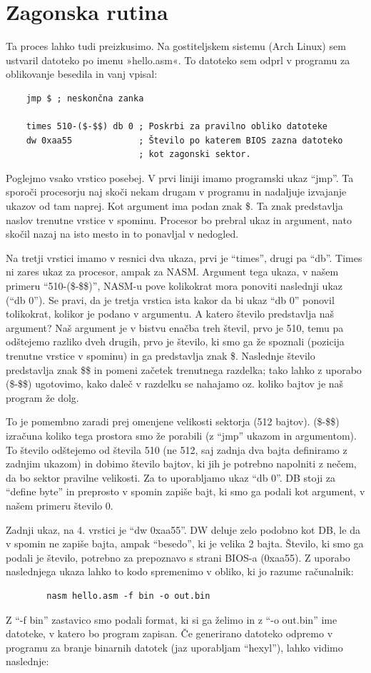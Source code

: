 \documentclass{report}
\begin{document}
\section{Zagonska rutina}
Ta proces lahko tudi preizkusimo. Na gostiteljskem sistemu (Arch Linux) sem ustvaril datoteko po imenu »hello.asm«. To datoteko sem odprl v programu za oblikovanje besedila in vanj vpisal:
\begin{verbatim}
    jmp $ ; neskončna zanka

    times 510-($-$$) db 0 ; Poskrbi za pravilno obliko datoteke
    dw 0xaa55             ; Število po katerem BIOS zazna datoteko
                          ; kot zagonski sektor.
\end{verbatim}

Poglejmo vsako vrstico posebej. V prvi liniji imamo programski ukaz ``jmp''. Ta
sporoči procesorju naj skoči nekam drugam v programu in nadaljuje izvajanje
ukazov od tam naprej. Kot argument ima podan znak \$. Ta znak predstavlja naslov trenutne vrstice v spominu. Procesor bo prebral ukaz in argument, nato skočil nazaj na isto mesto in to ponavljal v nedogled.

Na tretji vrstici imamo v resnici dva ukaza, prvi je ``times'', drugi pa ``db''.
Times ni zares ukaz za procesor, ampak za NASM. Argument tega ukaza, v našem
primeru ``510-(\$-\$\$)'', NASM-u pove kolikokrat mora ponoviti naslednji ukaz
(``db 0''). Se pravi, da je tretja vrstica ista kakor da bi ukaz ``db 0'' ponovil
tolikokrat, kolikor je podano v argumentu. A katero število predstavlja naš
argument? Naš argument je v bistvu enačba treh števil, prvo je 510, temu pa
odštejemo razliko dveh drugih, prvo je število, ki smo ga že spoznali (pozicija
trenutne vrstice v spominu) in ga predstavlja znak \$. Naslednje število
predstavlja znak \$\$ in pomeni začetek trenutnega razdelka; tako lahko z
uporabo (\$-\$\$) ugotovimo, kako daleč v razdelku se nahajamo oz. koliko bajtov je naš program že dolg.

To je pomembno zaradi prej omenjene velikosti sektorja (512 bajtov). (\$-\$\$)
izračuna koliko tega prostora smo že porabili (z ``jmp'' ukazom in argumentom).
To število odštejemo od števila 510 (ne 512, saj zadnja dva bajta definiramo z
zadnjim ukazom) in dobimo število bajtov, ki jih je potrebno napolniti z nečem,
da bo sektor pravilne velikosti. Za to uporabljamo ukaz ``db 0''. DB stoji za
``define byte'' in preprosto v spomin zapiše bajt, ki smo ga podali kot argument, v našem primeru število 0.

Zadnji ukaz, na 4. vrstici je ``dw 0xaa55''. DW deluje zelo podobno kot DB, le
da v spomin ne zapiše bajta, ampak ``besedo'', ki je velika 2 bajta. Število, ki smo ga podali je število, potrebno za prepoznavo s strani BIOS-a (0xaa55).
Z uporabo naslednjega ukaza lahko to kodo spremenimo v obliko, ki jo razume računalnik:
    \begin{verbatim}
        nasm hello.asm -f bin -o out.bin
    \end{verbatim}
Z ``-f bin'' zastavico smo podali format, ki si ga želimo in z ``-o out.bin'' ime datoteke, v katero bo program zapisan. Če generirano datoteko odpremo v programu za branje binarnih datotek (jaz uporabljam ``hexyl''), lahko vidimo naslednje:
\end{document}
